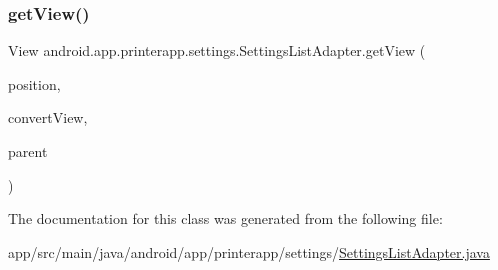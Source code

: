 \subsubsection{\texorpdfstring{get\+View()}{getView()}}
{\footnotesize\ttfamily View android.\+app.\+printerapp.\+settings.\+Settings\+List\+Adapter.\+get\+View (\begin{DoxyParamCaption}\item[{int}]{position,  }\item[{View}]{convert\+View,  }\item[{View\+Group}]{parent }\end{DoxyParamCaption})}



The documentation for this class was generated from the following file\+:\begin{DoxyCompactItemize}
\item 
app/src/main/java/android/app/printerapp/settings/\hyperlink{_settings_list_adapter_8java}{Settings\+List\+Adapter.\+java}\end{DoxyCompactItemize}
